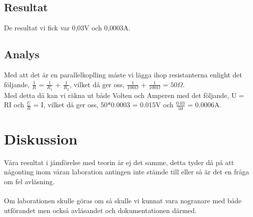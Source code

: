 \documentclass[11p]{article}
\begin{document}
    \subsection{Resultat}
    De resultat vi fick var 0,03V och 0,0003A.

    \subsection{Analys}
    Med att det är en parallelkoplling måste vi lägga ihop resistanterna enlight det följande, $\frac{1}{R}$ = $\frac{1}{R_1}$ + $\frac{1}{R_2}$, vilket då ger oss, $\frac{1}{100\Omega}$ + $\frac{1}{100\Omega}$ = $50\Omega$.\\
    Med detta då kan vi räkna ut både Volten och Amperen med det följande, U = RI och $\frac{U}{R}$ = I, vilket då ger oss, 50*0.0003 = 0.015V och $\frac{0.03}{50}$ = 0.0006A.

    \section{Diskussion}
    Våra resultat i jämförelse med teorin är ej det samme, detta tyder då på att någonting inom våran laboration antingen inte stämde till eller så är det en fråga om fel avläsning.\\
    \\
    Om laborationen skulle göras om så skulle vi kunnat vara nogranare med både utförandet men också avläsandet och dokumentationen därmed.
\end{document}
